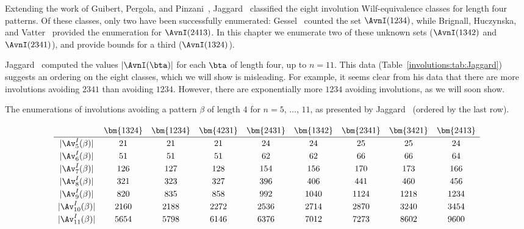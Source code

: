 \documentclass[12pt,twoside]{memoir}
\begin{document}
      Extending the work of Guibert, Pergola, and Pinzani~\cite{Guibert2001},
      Jaggard~\cite{Jaggard2002} classified the eight involution Wilf-equivalence
      classes for length four patterns.  Of these classes, only two have been
      successfully enumerated: Gessel~\cite{Gessel1990} counted the set
      $\AvnI(1234)$, while Brignall, Huczynska, and Vatter~\cite{Brignall2008}
      provided the enumeration for $\AvnI(2413)$. In this chapter we enumerate two
      of these unknown sets ($\AvnI(1342)$ and $\AvnI(2341)$), and provide bounds
      for a third ($\AvnI(1324)$). 

      Jaggard~\cite{Jaggard2002} computed the values $|\AvnI(\bta)|$ for each $\bta$
      of length four, up to $n=11$. This data (Table~\ref{involutions:tab:Jaggard})
      suggests an ordering on the eight classes, which we will show is misleading.
      For example, it seems clear from his data that there are more involutions
      avoiding $2341$ than avoiding $1234$. However, there are exponentially more $1234$
      avoiding involutions, as we will soon show. 

      
      \begin{table}[t]
      \caption[The enumeration of involutions avoiding a pattern]{The
                enumerations of involutions avoiding a pattern $\beta$ of length
                $4$ for $n=5$, $\dots$, $11$, as presented by
                Jaggard~\cite{Jaggard2002} (ordered by the last row).}
      \label{involutions:tab:Jaggard}
        $$
        \begin{array}{ccccccccc}%
        &&&&&&&&\\[-10pt]
        &\bm{1324}&\bm{1234}&\bm{4231}&\bm{2431}&\bm{1342}&\bm{2341}&\bm{3421}&\bm{2413}\\[1pt]
        \hline
        &&&&&&&&\\[-11pt]
        |\Av^I_{5}(\beta)|&21&21&21&24&24&25&25&24\\[1pt]
        &&&&&&&&\\[-11pt]
        |\Av^I_{6}(\beta)|&51&51&51&62&62&66&66&64\\[1pt]
        &&&&&&&&\\[-11pt]
        |\Av^I_{7}(\beta)|&126&127&128&154&156&170&173&166\\[1pt]
        &&&&&&&&\\[-11pt]
        |\Av^I_{8}(\beta)|&321&323&327&396&406&441&460&456\\[1pt]
        &&&&&&&&\\[-11pt]
        |\Av^I_{9}(\beta)|&820&835&858&992&1040&1124&1218&1234\\[1pt]
        &&&&&&&&\\[-11pt]
        |\Av^I_{10}(\beta)|&2160&2188&2272&2536&2714&2870&3240&3454\\[1pt]
        &&&&&&&&\\[-11pt]
        |\Av^I_{11}(\beta)|&5654&5798&6146&6376&7012&7273&8602&9600\\[1pt]
        \end{array}
        $$
      \end{table}
\end{document}
